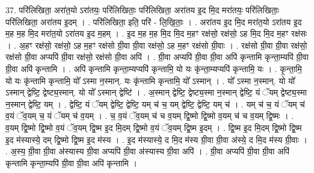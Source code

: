 \documentclass[17pt]{extarticle}
\begin{document}
37. परि॑लिखिता॒ अरा॑त॒यो ऽरा॑तयः॒ परि॑लिखिताः॒ परि॑लिखिता॒ अरा॑तय इ॒द मि॒द मरा॑तयः॒ परि॑लिखिताः॒ परि॑लिखिता॒ अरा॑तय इ॒दम् । . परि॑लिखिता॒ इति॒ परि॑ - लि॒खि॒ताः॒ । . अरा॑तय इ॒द मि॒द मरा॑त॒यो ऽरा॑तय इ॒द म॒ह म॒ह मि॒द मरा॑त॒यो ऽरा॑तय इ॒द म॒हम् । . इ॒द म॒ह म॒ह मि॒द मि॒द म॒हꣳ रक्ष॑सो॒ रक्ष॑सो॒ ऽह मि॒द मि॒द म॒हꣳ रक्ष॑सः । . अ॒हꣳ रक्ष॑सो॒ रक्ष॑सो॒ ऽह म॒हꣳ रक्ष॑सो ग्री॒वा ग्री॒वा रक्ष॑सो॒ ऽह म॒हꣳ रक्ष॑सो ग्री॒वाः । . रक्ष॑सो ग्री॒वा ग्री॒वा रक्ष॑सो॒ रक्ष॑सो ग्री॒वा अप्यपि॑ ग्री॒वा रक्ष॑सो॒ रक्ष॑सो ग्री॒वा अपि॑ । . ग्री॒वा अप्यपि॑ ग्री॒वा ग्री॒वा अपि॑ कृन्तामि कृन्ता॒म्यपि॑ ग्री॒वा ग्री॒वा अपि॑ कृन्तामि । . अपि॑ कृन्तामि कृन्ता॒म्यप्यपि॑ कृन्तामि॒ यो यः कृ॑न्ता॒म्यप्यपि॑ कृन्तामि॒ यः । . कृ॒न्ता॒मि॒ यो यः कृ॑न्तामि कृन्तामि॒ यो᳚ ऽस्मा न॒स्मान्. यः कृ॑न्तामि कृन्तामि॒ यो᳚ ऽस्मान् । . यो᳚ ऽस्मा न॒स्मान्. यो यो᳚ ऽस्मान् द्वेष्टि॒ द्वेष्ट्य॒स्मान्. यो यो᳚ ऽस्मान् द्वेष्टि॑ । . अ॒स्मान् द्वेष्टि॒ द्वेष्ट्य॒स्मा न॒स्मान् द्वेष्टि॒ यं ॅयम् द्वेष्ट्य॒स्मा न॒स्मान् द्वेष्टि॒ यम् । . द्वेष्टि॒ यं ॅयम् द्वेष्टि॒ द्वेष्टि॒ यम् च॑ च॒ यम् द्वेष्टि॒ द्वेष्टि॒ यम् च॑ । . यम् च॑ च॒ यं ॅयम् च॑ व॒यं ॅव॒यम् च॒ यं ॅयम् च॑ व॒यम् । . च॒ व॒यं ॅव॒यम् च॑ च व॒यम् द्वि॒ष्मो द्वि॒ष्मो व॒यम् च॑ च व॒यम् द्वि॒ष्मः । . व॒यम् द्वि॒ष्मो द्वि॒ष्मो व॒यं ॅव॒यम् द्वि॒ष्म इ॒द मि॒दम् द्वि॒ष्मो व॒यं ॅव॒यम् द्वि॒ष्म इ॒दम् । . द्वि॒ष्म इ॒द मि॒दम् द्वि॒ष्मो द्वि॒ष्म इ॒द म॑स्यास्ये॒ दम् द्वि॒ष्मो द्वि॒ष्म इ॒द म॑स्य । . इ॒द म॑स्यास्ये॒ द मि॒द म॑स्य ग्री॒वा ग्री॒वा अ॑स्ये॒ द मि॒द म॑स्य ग्री॒वाः । . अ॒स्य॒ ग्री॒वा ग्री॒वा अ॑स्यास्य ग्री॒वा अप्यपि॑ ग्री॒वा अ॑स्यास्य ग्री॒वा अपि॑ । . ग्री॒वा अप्यपि॑ ग्री॒वा ग्री॒वा अपि॑ कृन्तामि कृन्ता॒म्यपि॑ ग्री॒वा ग्री॒वा अपि॑ कृन्तामि । \newline
\pagebreak
{}
\end{document}
